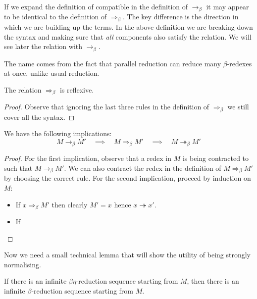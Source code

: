 \begin{remark}
    If we expand the definition of compatible in the definition of $\to_{\beta}$ it may appear to be identical to the definition of $\Rightarrow_{\beta}$. The key difference is the direction in which we are building up the terms. In the above definition we are breaking down the syntax and making sure that \emph{all} components also satisfy the relation. We will see later the relation with $\to_{\beta}$.
\end{remark}

\begin{remark}
    The name comes from the fact that parallel reduction can reduce many $\beta$-redexes at once, unlike usual reduction.
\end{remark}

\begin{cor}
    The relation $\Rightarrow_\beta$ is reflexive.
\end{cor}

\begin{proof}
    Observe that ignoring the last three rules in the definition of $\Rightarrow_\beta$ we still cover all the syntax.
\end{proof}

\begin{lemma}
    We have the following implications:
    $$
        M \to_\beta M' \quad \implies \quad M \Rightarrow_\beta M' \quad \implies \quad M \twoheadrightarrow_\beta M'
    $$
\end{lemma}

\begin{proof}
    For the first implication, observe that a redex in $M$ is being contracted to such that $M \to_\beta M'$. We can also contract the redex in the definition of $M \Rightarrow_\beta M'$ by choosing the correct rule. For the second implication, proceed by induction on $M$:
    \begin{itemize}
        \item If $x \Rightarrow_\beta M'$ then clearly $M'=x$ hence $x \twoheadrightarrow x'$.
        \item If 
    \end{itemize}
\end{proof}


Now we need a small technical lemma that will show the utility of being strongly normalising.

\begin{lemma}
    If there is an infinite $\beta \eta$-reduction sequence starting from $M$, then there is an infinite $\beta$-reduction sequence starting from $M$.
\end{lemma}

